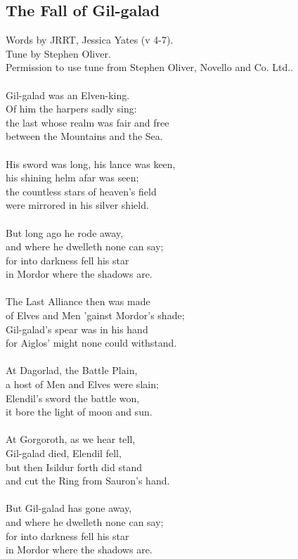 \begin{multicols}{2}
\section{The Fall of Gil-galad}
Words by JRRT, Jessica Yates (v 4-7).
\\
Tune by Stephen Oliver.
\\
Permission to use tune from Stephen Oliver, Novello and Co. Ltd..
\\
\\
Gil-galad was an Elven-king.
\\
Of him the harpers sadly sing:
\\
the last whose realm was fair and free
\\
between the Mountains and the Sea.
\\
\\
His sword was long, his lance was keen,
\\
his shining helm afar was seen;
\\
the countless stars of heaven’s field
\\
were mirrored in his silver shield.
\\
\\
But long ago he rode away,
\\
and where he dwelleth none can say;
\\
for into darkness fell his star
\\
in Mordor where the shadows are.
\\
\\
The Last Alliance then was made
\\
of Elves and Men ’gainst Mordor’s shade;
\\
Gil-galad’s spear was in his hand
\\
for Aiglos’ might none could withstand.
\\
\\
At Dagorlad, the Battle Plain,
\\
a host of Men and Elves were slain;
\\
Elendil’s sword the battle won,
\\
it bore the light of moon and sun.
\\
\\
At Gorgoroth, as we hear tell,
\\
Gil-galad died, Elendil fell,
\\
but then Isildur forth did stand
\\
and cut the Ring from Sauron’s hand.
\\
\\
But Gil-galad has gone away,
\\
and where he dwelleth none can say;
\\
for into darkness fell his star
\\
in Mordor where the shadows are.
\end{multicols}
